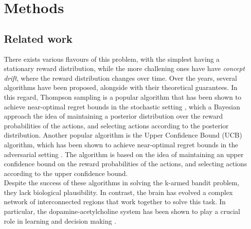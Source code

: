 

\section{Methods}

\subsection{Related work}
There exists various flavours of this problem, with the simplest having a stationary reward distribution, while the more challening ones have have \textit{concept drift}, where the reward distribution changes over time.
Over the years, several algorithms have been proposed, alongside with their theoretical guarantees. In this regard, Thompson sampling is a popular algorithm that has been shown to achieve near-optimal regret bounds in the stochastic setting \cite{agrawalAnalysisThompsonSampling2012}, which 
a Bayesian approach  the idea of maintaining a posterior distribution over the reward probabilities of the actions, and selecting actions according to the posterior distribution. Another popular algorithm is the Upper Confidence Bound (UCB) algorithm, which has been shown to achieve near-optimal
regret bounds in the adversarial setting \cite{auerFinitetimeAnalysisMultiarmed2002}. The algorithm is based on the idea of maintaining an upper confidence bound on the reward probabilities of the actions, and selecting actions according to the upper confidence bound.
\\
Despite the success of these algorithms in solving the k-armed bandit problem, they lack biological plausibility. In contrast, the brain has evolved a complex network of interconnected regions that work together to solve this task. In particular, the dopamine-acetylcholine system has been shown to
play a crucial role in learning and decision making \cite{dayanDecisionTheoryReinforcement2008}.

